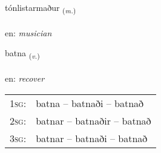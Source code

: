 \documentclass[frontgrid, backgrid]{flacards}\usepackage[]{graphicx}\usepackage[]{xcolor}
\begin{document}
\renewcommand{\blhead}{\vskip5pt {\small\bfseries\footnotesize Nafnorð | Noun }}
\renewcommand{\bcfoot}{\vskip5pt \hspace{2pt}{\small\bfseries\footnotesize 3K}}


{tónlistarmaður \small{\textsubscript{(\textit{m.})}} \\[1ex] %
\textphonetic{[tʰounlɪstarmaðʏr]} \\
en: \emph{musician} \\  [2ex]
\renewcommand*{\arraystretch}{0.8}
}

\renewcommand{\flhead}{\vskip5pt \fboxsep=0pt {\small\bfseries\footnotesize Sagnorð | Verb}}
\renewcommand{\fcfoot}{\vskip5pt \fboxsep=0pt \hspace{2pt}{\small\bfseries\footnotesize 3K}}

\renewcommand{\blhead}{\vskip5pt {\small\bfseries\footnotesize Sagnorð | Verb }}
\renewcommand{\bcfoot}{\vskip5pt \hspace{2pt}{\small\bfseries\footnotesize 3K}}


{batna \small{\textsubscript{(\textit{v.})}} \\[1ex] %
\textphonetic{[pahtna]} \\
en: \emph{recover} \\  [2ex]
\renewcommand*{\arraystretch}{0.8}
\begin{tabular}{p{1cm}l}
\textsc{1sg}: & batna -- batnaði -- batnað \\ 
\textsc{2sg}: & batnar -- batnaðir -- batnað \\ 
\textsc{3sg}: & batnar -- batnaði -- batnað \\ 
\end{tabular}
}
\end{document}
